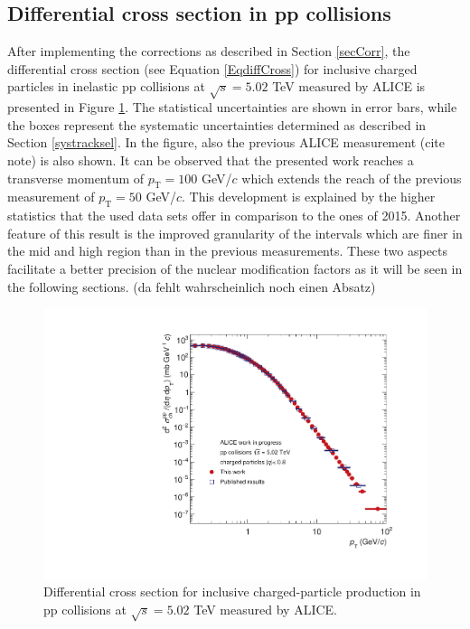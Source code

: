 \documentclass[12pt,a4paper]{report}
\begin{document}
\subsection{Differential cross section in pp collisions}
After implementing the corrections as described in Section \ref{secCorr}, the differential cross section (see Equation \ref{EqdiffCross}) for inclusive charged particles in inelastic pp collisions at $\sqrt{s}=5.02$ TeV measured by ALICE is presented in Figure \ref{diffCross}. The statistical uncertainties are shown in error bars, while the boxes represent the systematic uncertainties determined as described in Section \ref{systracksel}. In the figure, also the previous ALICE measurement (cite note) is also shown. It can be observed that the presented work reaches a transverse momentum of $p_\text{T} = 100$ GeV/$c$ which extends the \pt reach of the previous measurement of $p_\text{T} = 50$ GeV/$c$. This development is explained by the higher statistics that the used data sets offer in comparison to the ones of 2015. Another feature of this result is the improved granularity of the \pt intervals which are finer in the mid and high \pt region than in the previous measurements. These two aspects facilitate a better precision of the nuclear modification factors as it will be seen in the following sections. 
(da fehlt wahrscheinlich noch einen Absatz)
\begin{figure}[tb!]
\centering
\includegraphics[width=12cm]{Plots/diffCrosspp.pdf}  
\caption{Differential cross section for inclusive charged-particle production in pp collisions at $\sqrt{s}=5.02$ TeV measured by ALICE.}
\label{diffCross}
\end{figure}
\end{document}
